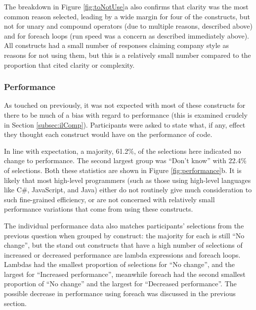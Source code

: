 \documentclass{article}
\begin{document}
            The breakdown in Figure \ref{fig:toNotUse}a also confirms that clarity was the most common reason selected, leading by a wide margin for four of the constructs, but not for unary and compound operators (due to multiple reasons, described above) and for foreach loops (run speed was a concern as described immediately above).
            All constructs had a small number of responses claiming company style as reasons for not using them, but this is a relatively small number compared to the proportion that cited clarity or complexity.
        \subsubsection{Performance}
            As touched on previously, it was not expected with most of these constructs for there to be much of a bias with regard to performance (this is examined crudely in Section \ref{subsec:ilComp}). Participants were asked to state what, if any, effect they thought each construct would have on the performance of code.
            \newline

            In line with expectation, a majority, 61.2\%, of the selections here indicated no change to performance. The second largest group was ``Don't know'' with 22.4\% of selections. Both these statistics are shown in Figure \ref{fig:performance}b. It is likely that most high-level programmers (such as those using high-level languages like C\#, JavaScript, and Java) either do not routinely give much consideration to such fine-grained efficiency, or are not concerned with relatively small performance variations that come from using these constructs.

            The individual performance data also matches participants' selections from the previous question when grouped by construct: the majority for each is still ``No change'', but the stand out constructs that have a high number of selections of increased or decreased performance are lambda expressions and foreach loops. Lambdas had the smallest proportion of selections for ``No change'', and the largest for ``Increased performance'', meanwhile foreach had the second smallest proportion of ``No change'' and the largest for ``Decreased performance''. The possible decrease in performance using foreach was discussed in the previous section.
\end{document}
